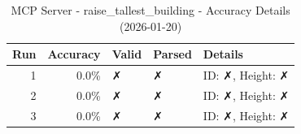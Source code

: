 \begin{table}[ht]
\centering
\small
\caption{MCP Server - raise\_tallest\_building - Accuracy Details (2026-01-20)}
\label{tab:mcp\_raise\_tallest\_building\_accuracy\_2026-01-20}
\begin{tabular}{r r l l p{6cm}}
\hline
Run & Accuracy & Valid & Parsed & Details \\
\hline
1 & 0.0\% & ✗ & ✗ & ID: ✗, Height: ✗ \\
2 & 0.0\% & ✗ & ✗ & ID: ✗, Height: ✗ \\
3 & 0.0\% & ✗ & ✗ & ID: ✗, Height: ✗ \\
\hline
\end{tabular}
\end{table}
